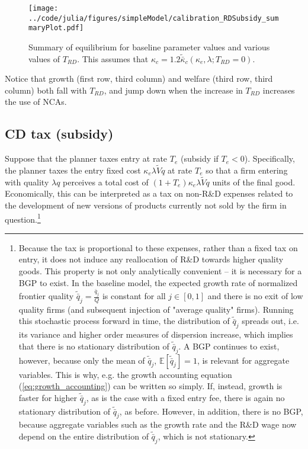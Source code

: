 \documentclass[11pt,english]{article}
\theoremstyle{remark}
\begin{document}
\begin{figure}[]
	\texttt{[image: ../code/julia/figures/simpleModel/calibration\_RDSubsidy\_summaryPlot.pdf]}
	\caption{Summary of equilibrium for baseline parameter values and various values of $T_{RD}$. This assumes that $\kappa_c = 1.2 \tilde{\bar{\kappa}}_c(\kappa_e,\lambda;T_{RD} = 0)$.}
	\label{calibration_RDSubsidy_summaryPlot}
\end{figure}

Notice that growth (first row, third column) and welfare (third row, third column) both fall with $T_{RD}$, and jump down when the increase in $T_{RD}$ increases the use of NCAs.


\subsection{CD tax (subsidy)}

Suppose that the planner taxes entry at rate $T_e$ (subsidy if $T_e < 0$). Specifically, the planner taxes the entry fixed cost $\kappa_e \lambda \tilde{V} q$ at rate $T_e$ so that a firm entering with quality $\lambda q$ perceives a total cost of $(1+T_e) \kappa_e \lambda \tilde{V}q$ units of the final good. Economically, this can be interpreted as a tax on non-R\&D expenses related to the development of new versions of products currently not sold by the firm in question.\footnote{Because the tax is proportional to these expenses, rather than a fixed tax on entry, it does not induce any reallocation of R\&D towards higher quality goods. This property is not only analytically convenient -- it is necessary for a BGP to exist. In the baseline model, the expected growth rate of normalized frontier quality $\tilde{\bar{q}}_j = \frac{\bar{q}_j}{Q}$ is constant for all $j \in [0,1]$ and there is no exit of low quality firms (and subsequent injection of "average quality" firms). Running this stochastic process forward in time, the distribution of $\tilde{\bar{q}}_j$ spreads out, i.e. its variance and higher order measures of dispersion increase, which implies that there is no stationary distribution of $\tilde{\bar{q}}_j$. A BGP continues to exist, however, because only the mean of $\tilde{\bar{q}}_j$, $\mathbb{E}[\tilde{\bar{q}}_j] = 1$, is relevant for aggregate variables. This is why, e.g. the growth accounting equation (\ref{eq:growth_accounting}) can be written so simply. If, instead, growth is faster for higher $\tilde{\bar{q}}_j$, as is the case with a fixed entry fee, there is again no stationary distribution of $\tilde{\bar{q}}_j$, as before. However, in addition, there is no BGP, because aggregate variables such as the growth rate and the R\&D wage now depend on the entire distribution of $\tilde{\bar{q}}_j$, which is not stationary.}
\end{document}
